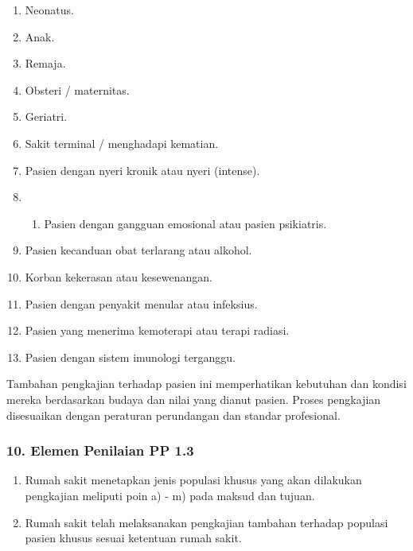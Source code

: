 \documentclass[
]{book}
\providecommand{\tightlist}{%
  \setlength{\itemsep}{0pt}\setlength{\parskip}{0pt}}
\begin{document}
\begin{enumerate}
\def\labelenumi{\alph{enumi}.}
\item
  Neonatus.
\item
  Anak.
\item
  Remaja.
\item
  Obsteri / maternitas.
\item
  Geriatri.
\item
  Sakit terminal / menghadapi kematian.
\item
  Pasien dengan nyeri kronik atau nyeri (intense).
\item
  \begin{enumerate}
  \def\labelenumii{\alph{enumii})}
  \setcounter{enumii}{7}
  \tightlist
  \item
    Pasien dengan gangguan emosional atau pasien psikiatris.
  \end{enumerate}
\item
  Pasien kecanduan obat terlarang atau alkohol.
\item
  Korban kekerasan atau kesewenangan.
\item
  Pasien dengan penyakit menular atau infeksius.
\item
  Pasien yang menerima kemoterapi atau terapi radiasi.
\item
  Pasien dengan sistem imunologi terganggu.
\end{enumerate}

Tambahan pengkajian terhadap pasien ini memperhatikan kebutuhan dan kondisi mereka berdasarkan budaya dan nilai yang dianut pasien. Proses pengkajian disesuaikan dengan peraturan perundangan dan standar profesional.

\hypertarget{elemen-penilaian-pp-1.3}{%
\subsubsection*{10. Elemen Penilaian PP 1.3}\label{elemen-penilaian-pp-1.3}}

\begin{enumerate}
\def\labelenumi{\alph{enumi}.}
\tightlist
\item
  Rumah sakit menetapkan jenis populasi khusus yang akan dilakukan pengkajian meliputi poin a) - m) pada maksud dan tujuan.
\item
  Rumah sakit telah melaksanakan pengkajian tambahan terhadap populasi pasien khusus sesuai ketentuan rumah sakit.
\end{enumerate}
\end{document}
